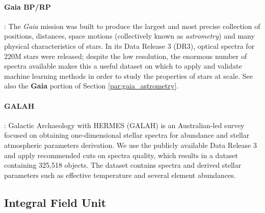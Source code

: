 \paragraph{Gaia BP/RP}: The \textit{Gaia} mission was built to produce the largest and most precise collection of positions, distances, space motions (collectively known as \textit{astrometry}) and many physical characteristics of stars. In its Data Release 3 (DR3), optical spectra for 220M stars were released; despite the low resolution, the enormous number of spectra available makes this a useful dataset on which to apply and validate machine learning methods in order to study the properties of stars at scale. See also the \textbf{Gaia} portion of Section \ref{par:gaia_astrometry}.

\paragraph{GALAH}: Galactic Archaeology with HERMES (GALAH) \cite{GALAH_de_silva} is an Australian-led survey focused on obtaining one-dimensional stellar spectra for abundance and stellar atmospheric parameters derivation. We use the publicly available Data Release 3 \cite{GALAH_Buder} and apply recommended cuts on spectra quality, which results in a dataset containing 325,518 objects. The dataset contains spectra and derived stellar parameters such as effective temperature and several element abundances.

\subsection{Integral Field Unit}

